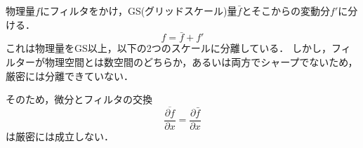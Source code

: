 \documentclass[12pt,a4paper]{jsarticle}
\begin{document}
%
%
%
%
%



物理量$f$にフィルタをかけ，GS(グリッドスケール)量$\bar{f}$とそこからの変動分$f'$に分ける．
\begin{equation}
  f = \bar{f} +f' \tag{7.7}
  \label{eq:Filter}
\end{equation}
これは物理量をGS以上，以下の2つのスケールに分離している．
しかし，フィルターが物理空間とは数空間のどちらか，あるいは両方でシャープでないため，厳密には分離できていない．

そのため，微分とフィルタの交換
\begin{equation}
  \overline{ \frac{\partial f}{\partial x} } = \frac{\partial \bar{f}}{\partial x}
  \label{eq:ExchangeofFilterDerivative}
\end{equation}
は厳密には成立しない．\\
\end{document}
